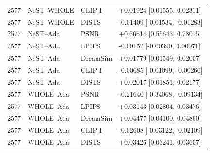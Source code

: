 \documentclass[10pt,letterpaper]{article}
\begin{document}
\begin{longtable}{@{}rlll@{}}
2577 & NeST--WHOLE & CLIP-I & +0.01924 [0.01555, 0.02311]\\
2577 & NeST--WHOLE & DISTS & -0.01409 [-0.01534, -0.01283]\\
2577 & NeST--Ada & PSNR & +0.66614 [0.55643, 0.78015]\\
2577 & NeST--Ada & LPIPS & -0.00152 [-0.00390, 0.00071]\\
2577 & NeST--Ada & DreamSim & +0.01779 [0.01549, 0.02007]\\
2577 & NeST--Ada & CLIP-I & -0.00685 [-0.01099, -0.00266]\\
2577 & NeST--Ada & DISTS & +0.02017 [0.01851, 0.02177]\\
2577 & WHOLE--Ada & PSNR & -0.21640 [-0.34068, -0.09134]\\
2577 & WHOLE--Ada & LPIPS & +0.03143 [0.02804, 0.03476]\\
2577 & WHOLE--Ada & DreamSim & +0.04477 [0.04100, 0.04860]\\
2577 & WHOLE--Ada & CLIP-I & -0.02608 [-0.03122, -0.02109]\\
2577 & WHOLE--Ada & DISTS & +0.03426 [0.03241, 0.03607]\\
\bottomrule\end{longtable}
\end{document}
